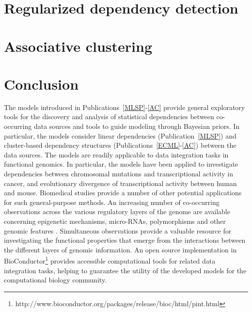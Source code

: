 

\section{Regularized dependency detection}\label{sec:pairwise}


\section{Associative clustering}


\section{Conclusion}

The models introduced in Publications~\ref{MLSP}-\ref{AC} provide
general exploratory tools for the discovery and analysis of
statistical dependencies between co-occurring data sources and tools
to guide modeling through Bayesian priors. In particular, the models
consider linear dependencies (Publication~\ref{MLSP}) and
cluster-based dependency structures (Publications~\ref{ECML}-\ref{AC})
between the data sources. The models are readily applicable to data
integration tasks in functional genomics. In particular, the models
have been applied to investigate dependencies between chromosomal
mutations and transcriptional activity in cancer, and evolutionary
divergence of transcriptional activity between human and mouse.
Biomedical studies provide a number of other potential applications
for such general-purpose methods. An increasing number of co-occurring
observations across the various regulatory layers of the genome are
available concerning epigenetic mechanisms, micro-RNAs, polymorphisms
and other genomic features \citep{tcga08}. Simultaneous observations
provide a valuable resource for investigating the functional
properties that emerge from the interactions between the different
layers of genomic information. An open source implementation in
BioConductor\footnote{http://www.bioconductor.org/packages/release/bioc/html/pint.html}
provides accessible computational tools for related data integration
tasks, helping to guarantee the utility of the developed models for
the computational biology community.

